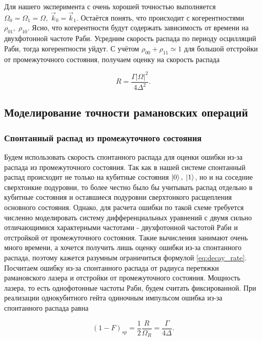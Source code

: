 Для нашего эксперимента с очень хорошей точностью выполняется $\Omega_0=\Omega_1=\Omega,\; \vec{k}_0=\vec{k}_1$. Остаётся понять, что происходит с когерентностями $\rho_{01},\; \rho_{10}$. Ясно, что когерентности будут содержать зависимость от времени на двухфотонной частоте Раби. Усредним скорость распада по периоду осцилляций Раби, тогда когерентности уйдут. С учётом $\rho_{00}+\rho_{11}\simeq 1$ для большой отстройки от промежуточного состояния, получаем оценку на скорость распада

\begin{equation}
	R=\frac{\Gamma|\Omega|^2}{4\Delta^2}.
	\label{eq:decay_rate}
\end{equation}



\subsection{Моделирование точности рамановских операций}

\subsubsection{Спонтанный распад из промежуточного состояния}
\label{sec:spontaneous}

Будем использовать скорость спонтанного распада для оценки ошибки из-за распада из промежуточного состояния. Так как в нашей системе спонтанный распад происходит не только на кубитные состояния $\left| 0 \right\rangle, \; \left| 1 \right\rangle$, но и на соседние сверхтонкие подуровни, то более честно было бы учитывать распад отдельно в кубитные состояния и оставшиеся подуровни сверхтонкого расщепления основного состояния. Однако, для расчета ошибки по такой схеме требуется численно моделировать систему дифференциальных уравнений с двумя сильно отличающимися характерными частотами - двухфотонной частотой Раби и отстройкой от промежуточного состояния. Такие вычисления занимают очень много времени, а хочется получить лишь оценку ошибки из-за спонтанного распада, поэтому кажется разумным ограничиться формулой \ref{eq:decay_rate}. Посчитаем ошибку из-за спонтанного распада от радиуса перетяжки рамановского лазера и отстройки от промежуточного состояния. Мощность лазера, то есть однофотонные частоты Раби, будем считать фиксированной. При реализации однокубитного гейта одиночным импульсом ошибка из-за спонтанного распада равна 

\begin{equation}
	(1-F)_{sp}=\frac{1}{2}\frac{R}{\Omega_{R}} = \frac{\Gamma}{4\Delta}.
\end{equation}

